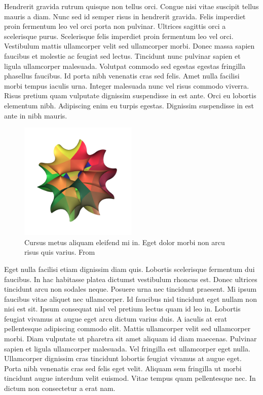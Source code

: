 \documentclass[12pt, a4paper]{article}
\numberwithin{equation}{section}
\begin{document}
Hendrerit gravida rutrum quisque non tellus orci. Congue nisi vitae suscipit tellus mauris a diam. Nunc sed id semper risus in hendrerit gravida. Felis imperdiet proin fermentum leo vel orci porta non pulvinar. Ultrices sagittis orci a scelerisque purus. Scelerisque felis imperdiet proin fermentum leo vel orci. Vestibulum mattis ullamcorper velit sed ullamcorper morbi. Donec massa sapien faucibus et molestie ac feugiat sed lectus. Tincidunt nunc pulvinar sapien et ligula ullamcorper malesuada. Volutpat commodo sed egestas egestas fringilla phasellus faucibus. Id porta nibh venenatis cras sed felis. Amet nulla facilisi morbi tempus iaculis urna. Integer malesuada nunc vel risus commodo viverra. Risus pretium quam vulputate dignissim suspendisse in est ante. Orci eu lobortis elementum nibh. Adipiscing enim eu turpis egestas. Dignissim suspendisse in est ante in nibh mauris.

\begin{figure}[ht]
  \centering
  \includegraphics[width=0.5\textwidth]{CalabiYau5.jpg}
  \caption{Cursus metus aliquam eleifend mi in. Eget dolor morbi non arcu risus quis varius. From \cite{wiki:xxx}}
  \label{fig:calabi-yau}
\end{figure}

Eget nulla facilisi etiam dignissim diam quis. Lobortis scelerisque fermentum dui faucibus. In hac habitasse platea dictumst vestibulum rhoncus est. Donec ultrices tincidunt arcu non sodales neque. Posuere urna nec tincidunt praesent. Mi ipsum faucibus vitae aliquet nec ullamcorper. Id faucibus nisl tincidunt eget nullam non nisi est sit. Ipsum consequat nisl vel pretium lectus quam id leo in. Lobortis feugiat vivamus at augue eget arcu dictum varius duis. A iaculis at erat pellentesque adipiscing commodo elit. Mattis ullamcorper velit sed ullamcorper morbi. Diam vulputate ut pharetra sit amet aliquam id diam maecenas. Pulvinar sapien et ligula ullamcorper malesuada. Vel fringilla est ullamcorper eget nulla. Ullamcorper dignissim cras tincidunt lobortis feugiat vivamus at augue eget. Porta nibh venenatis cras sed felis eget velit. Aliquam sem fringilla ut morbi tincidunt augue interdum velit euismod. Vitae tempus quam pellentesque nec. In dictum non consectetur a erat nam.
\end{document}
